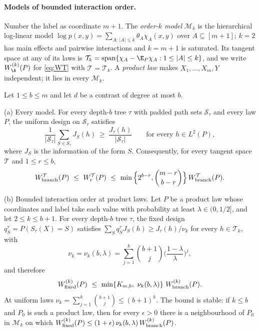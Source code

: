 \paragraph{Models of bounded interaction order.}
Number the label as coordinate $m+1$. The \emph{order-$k$ model}
$\mathcal M_k$ is the hierarchical log-linear model
$\log p(x,y)=\sum_{A:\,|A|\le k}\theta_A\chi_A(x,y)$ over
$A\subseteq[m+1]$; $k=2$ has main effects and pairwise interactions and
$k=m+1$ is saturated. Its tangent space at any of its laws is
$\mathcal T_k=\mathrm{span}\{\chi_A-\E_P\chi_A:1\le|A|\le k\}$, and we write
$W^{(k)}_\A(P)$ for \eqref{eq:WT} with $\mathcal T=\mathcal T_k$. A
\emph{product law} makes $X_1,\ldots,X_m,Y$ independent; it lies in every
$\mathcal M_k$.

\begin{theorem}\label{thm:structuredfull}
Let $1\le b\le m$ and let $d$ be a contrast of degree at most $b$.

\textup{(a) Every model.} For every depth-$b$ tree $\tau$ with padded path
sets $\mathcal S_\tau$ and every law $P$, the uniform design on
$\mathcal S_\tau$ satisfies
\begin{equation}
 \frac1{|\mathcal S_\tau|}\sum_{S\in\mathcal S_\tau}J_S(h)\ \ge\ \frac{J_\tau(h)}{|\mathcal S_\tau|}
 \qquad\text{for every }h\in L^2(P),\label{eq:infodom}
\end{equation}
where $J_S$ is the information of the form $S$. Consequently, for every
tangent space $\mathcal T$ and $1\le r\le b$,
\[
 W^{\mathcal T}_{\rm branch}(P)\ \le\ W^{\mathcal T}_r(P)\ \le\ \min\Big\{2^{b-r},\binom{m-r}{b-r}\Big\}\,W^{\mathcal T}_{\rm branch}(P).
\]

\textup{(b) Bounded interaction order at product laws.} Let $P$ be a product
law whose coordinates and label take each value with probability at least
$\lambda\in(0,1/2]$, and let $2\le k\le b+1$. For every depth-$b$ tree
$\tau$, the fixed design $q^\tau_S=P(S_\tau(X)=S)$ satisfies
$\sum_Sq^\tau_SJ_S(h)\ge J_\tau(h)/\nu_k$ for every $h\in\mathcal T_k$,
with
\[
 \nu_k=\nu_k(b,\lambda)=\sum_{j=1}^{k}\binom{b+1}{j}\Big(\frac{1-\lambda}{\lambda}\Big)^{j},
\]
and therefore
\[
 W^{(k)}_{\rm fixed}(P)\ \le\ \min\{K_{m,b},\ \nu_k(b,\lambda)\}\ W^{(k)}_{\rm branch}(P).
\]
At uniform laws $\nu_k=\sum_{j=1}^k\binom{b+1}{j}\le(b+1)^k$.
The bound is stable: if $k\le b$ and $P_0$ is such a product law, then for
every $\epsilon>0$ there is a neighbourhood of $P_0$ in $\mathcal M_k$ on
which $W^{(k)}_{\rm fixed}(P)\le(1+\epsilon)\,\nu_k(b,\lambda)\,W^{(k)}_{\rm branch}(P)$.


\end{theorem}

